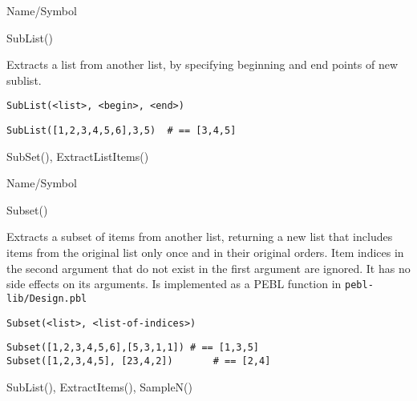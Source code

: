 \begin{desc}{Name/Symbol}
\item[Name/Symbol]  	SubList()

\item[Description] 	Extracts a list from another list, by specifying 
	     	beginning and end points of new sublist.

\item[Usage]
\begin{verbatim}
SubList(<list>, <begin>, <end>)
\end{verbatim}

\item[Example]     	
\begin{verbatim}
SubList([1,2,3,4,5,6],3,5)	# == [3,4,5]
\end{verbatim}

\item[See Also]    	SubSet(), ExtractListItems()
\end{desc}

\rl


\begin{desc}{Name/Symbol}
\item[Name/Symbol]  	Subset()

\item[Description] 	Extracts a subset of items from another list, returning a
	     	new list that includes items from the original list only
	     	once and in their original orders.  Item indices in the
	     	second argument that do not exist in the first argument
	     	are ignored.  It has no side effects on its arguments.
	     	Is implemented as a PEBL function in \verb+pebl-lib/Design.pbl+

\item[Usage]       	
\begin{verbatim}
Subset(<list>, <list-of-indices>)
\end{verbatim}

\item[Example]     	
\begin{verbatim}
Subset([1,2,3,4,5,6],[5,3,1,1])	# == [1,3,5]
Subset([1,2,3,4,5], [23,4,2])		# == [2,4]
\end{verbatim}

\item[See Also]   	SubList(), ExtractItems(), SampleN()
\end{desc}

\rl


